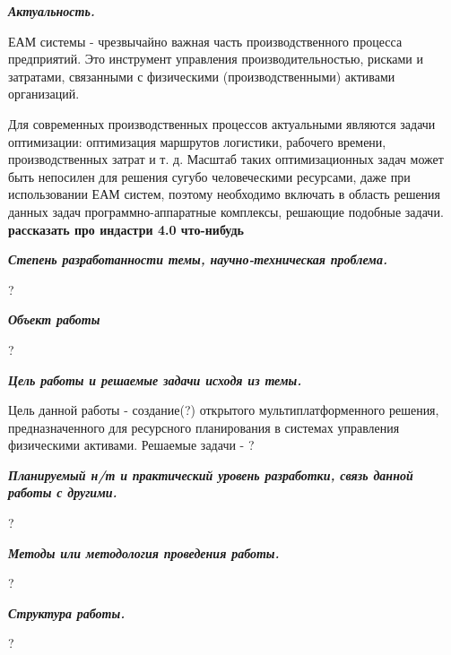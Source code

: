 
\textbf{\textit{Актуальность.}}

ЕАМ системы - чрезвычайно важная часть производственного процесса предприятий. Это инструмент управления производительностью, рисками и затратами, связанными с физическими (производственными) активами организаций.

Для современных производственных процессов актуальными являются задачи
оптимизации: оптимизация маршрутов логистики, рабочего времени, производственных
затрат и т. д. Масштаб таких оптимизационных задач может быть непосилен для решения
сугубо человеческими ресурсами, даже при использовании ЕАМ систем, поэтому необходимо включать в область решения данных задач программно-аппаратные комплексы, решающие подобные задачи.
\textbf{рассказать про индастри 4.0 что-нибудь}

\textbf{\textit{Степень разработанности темы, научно-техническая проблема.}}

?

\textbf{\textit{Объект работы}}

?

\textbf{\textit{Цель работы и решаемые задачи исходя из темы.}}

Цель данной работы - создание(?) открытого мультиплатформенного решения, предназначенного для ресурсного планирования в системах управления физическими активами. Решаемые задачи - ?

\textbf{\textit{Планируемый н/т и практический уровень разработки, связь данной
	работы с другими.}}

?

\textbf{\textit{Методы или методология проведения работы.}}

?

\textbf{\textit{Структура работы.}}

?

\clearpage
